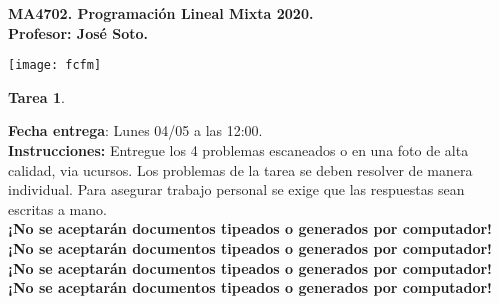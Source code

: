 \documentclass{article}
\theoremstyle{plain}
\theoremstyle{definition}
\theoremstyle{Azul}
\begin{document}
\setlength{\headheight}{14pt}
\vspace*{-1.2 cm}
\begin{minipage}{0.6\textwidth}
	\begin{flushleft}
		\hspace*{-0.5cm}\textbf{MA4702. Programación Lineal Mixta 2020.}\\
		\hspace*{-0.5cm}\textbf{Profesor: José Soto.}\\
	\end{flushleft}
\end{minipage}
\begin{minipage}{0.36\textwidth}
	\begin{flushright}
		\texttt{[image: fcfm]}
	\end{flushright}
\end{minipage}
\bigskip

\newif\ifsol
\soltrue
\solfalse

\begin{center}
  \LARGE \textbf{Tarea 1}.\\
\end{center}
\bigskip

\noindent\textbf{Fecha entrega}: Lunes 04/05 a las 12:00.\\
\textbf{Instrucciones:} Entregue los 4 problemas escaneados o en una foto de alta calidad, via ucursos.
Los problemas de la tarea se deben resolver de manera individual. Para asegurar trabajo personal se exige que las respuestas sean escritas a mano.\\


\noindent \textbf{¡No se aceptarán documentos tipeados o generados por computador!}\\
\textbf{¡No se aceptarán documentos tipeados o generados por computador!}\\
\textbf{¡No se aceptarán documentos tipeados o generados por computador!}\\
\textbf{¡No se aceptarán documentos tipeados o generados por computador!}\\
\end{document}
